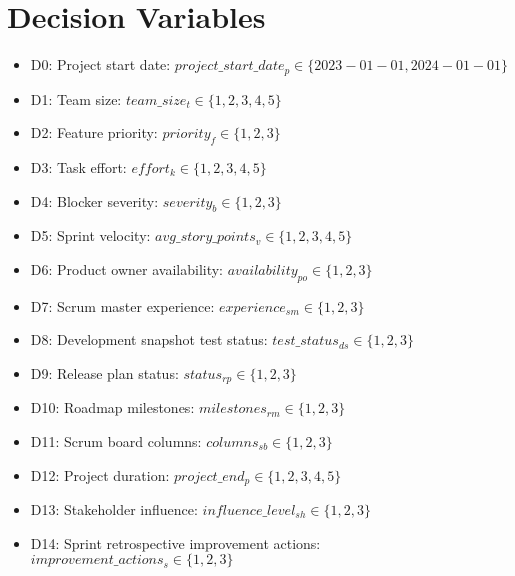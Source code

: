 \documentclass{article}
\begin{document}
\section{Decision Variables}
\begin{itemize}
    \item D0: Project start date: $project\_start\_date_p \in \{2023-01-01, 2024-01-01\}$
    \item D1: Team size: $team\_size_t \in \{1, 2, 3, 4, 5\}$
    \item D2: Feature priority: $priority_f \in \{1, 2, 3\}$
    \item D3: Task effort: $effort_k \in \{1, 2, 3, 4, 5\}$
    \item D4: Blocker severity: $severity_b \in \{1, 2, 3\}$
    \item D5: Sprint velocity: $avg\_story\_points_v \in \{1, 2, 3, 4, 5\}$
    \item D6: Product owner availability: $availability_{po} \in \{1, 2, 3\}$
    \item D7: Scrum master experience: $experience_{sm} \in \{1, 2, 3\}$
    \item D8: Development snapshot test status: $test\_status_{ds} \in \{1, 2, 3\}$
    \item D9: Release plan status: $status_{rp} \in \{1, 2, 3\}$
    \item D10: Roadmap milestones: $milestones_{rm} \in \{1, 2, 3\}$
    \item D11: Scrum board columns: $columns_{sb} \in \{1, 2, 3\}$
    \item D12: Project duration: $project\_end_p \in \{1, 2, 3, 4, 5\}$
    \item D13: Stakeholder influence: $influence\_level_{sh} \in \{1, 2, 3\}$
    \item D14: Sprint retrospective improvement actions: $improvement\_actions_s \in \{1, 2, 3\}$
\end{itemize}
\end{document}
